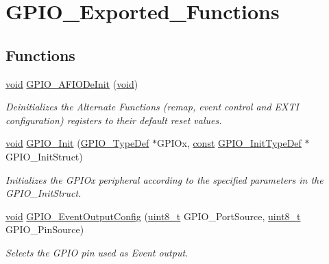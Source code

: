 \hypertarget{group___g_p_i_o___exported___functions}{\section{G\-P\-I\-O\-\_\-\-Exported\-\_\-\-Functions}
\label{group___g_p_i_o___exported___functions}
}
\subsection*{Functions}
\begin{DoxyCompactItemize}
\item 
\hyperlink{group___n_a_m_e_ga18028b8badbf1ea7e704ccac3c488e82}{void} \hyperlink{group___g_p_i_o___exported___functions_ga7f645e6b6146818c3d6c19021e70170c}{G\-P\-I\-O\-\_\-\-A\-F\-I\-O\-De\-Init} (\hyperlink{group___n_a_m_e_ga18028b8badbf1ea7e704ccac3c488e82}{void})
\begin{DoxyCompactList}\small\item\em Deinitializes the Alternate Functions (remap, event control and E\-X\-T\-I configuration) registers to their default reset values. \end{DoxyCompactList}\item 
\hyperlink{group___n_a_m_e_ga18028b8badbf1ea7e704ccac3c488e82}{void} \hyperlink{group___g_p_i_o___exported___functions_gacadddd71fbb06165d8e9bb54b42031ff}{G\-P\-I\-O\-\_\-\-Init} (\hyperlink{struct_g_p_i_o___type_def}{G\-P\-I\-O\-\_\-\-Type\-Def} $\ast$G\-P\-I\-Ox, \hyperlink{group___n_a_m_e_ga7ae6d0e43244213b34de2c2b9aa30da6}{const} \hyperlink{struct_g_p_i_o___init_type_def}{G\-P\-I\-O\-\_\-\-Init\-Type\-Def} $\ast$G\-P\-I\-O\-\_\-\-Init\-Struct)
\begin{DoxyCompactList}\small\item\em Initializes the G\-P\-I\-Ox peripheral according to the specified parameters in the G\-P\-I\-O\-\_\-\-Init\-Struct. \end{DoxyCompactList}\item 
\hyperlink{group___n_a_m_e_ga18028b8badbf1ea7e704ccac3c488e82}{void} \hyperlink{group___g_p_i_o___exported___functions_ga935f31ed7a86c6cb594cf34313b4b7af}{G\-P\-I\-O\-\_\-\-Event\-Output\-Config} (\hyperlink{stdint_8h_aba7bc1797add20fe3efdf37ced1182c5}{uint8\-\_\-t} G\-P\-I\-O\-\_\-\-Port\-Source, \hyperlink{stdint_8h_aba7bc1797add20fe3efdf37ced1182c5}{uint8\-\_\-t} G\-P\-I\-O\-\_\-\-Pin\-Source)
\begin{DoxyCompactList}\small\item\em Selects the G\-P\-I\-O pin used as Event output. \end{DoxyCompactList}\item 

\end{DoxyCompactItemize}
